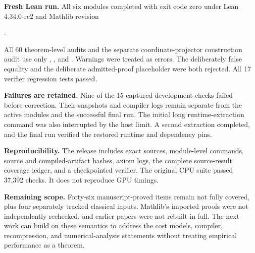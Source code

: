 \textbf{Fresh Lean run.} All six modules completed with exit code zero under Lean 4.34.0-rc2 and Mathlib revision
\begin{center}.
\end{center}
All 60 theorem-level audits and the separate coordinate-projector construction audit use only , , and . Warnings were treated as errors. The deliberately false equality and the deliberate admitted-proof placeholder were both rejected. All 17 verifier regression tests passed.

\textbf{Failures are retained.} Nine of the 15 captured development checks failed before correction. Their snapshots and compiler logs remain separate from the active modules and the successful final run. The initial long runtime-extraction command was also interrupted by the host limit. A second extraction completed, and the final run verified the restored runtime and dependency pins.

\textbf{Reproducibility.} The release includes exact sources, module-level commands, source and compiled-artifact hashes, axiom logs, the complete source-result coverage ledger, and a checkpointed verifier. The original CPU suite passed 37,392 checks. It does not reproduce GPU timings.

\textbf{Remaining scope.} Forty-six manuscript-proved items remain not fully covered, plus four separately tracked classical inputs. Mathlib's imported proofs were not independently rechecked, and earlier papers were not rebuilt in full. The next work can build on these semantics to address the cost models, compiler, recompression, and numerical-analysis statements without treating empirical performance as a theorem.
